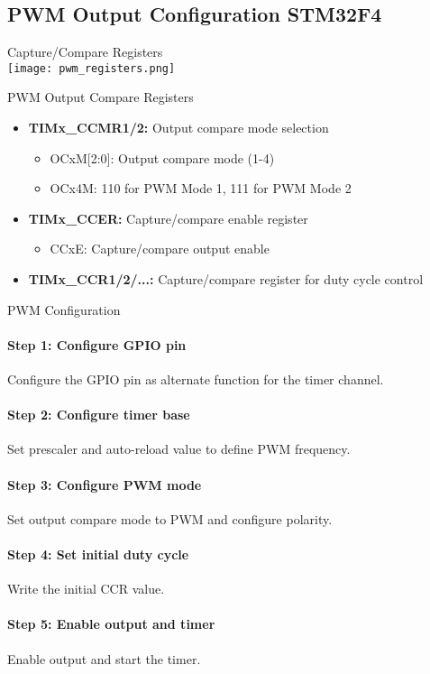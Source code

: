 \raggedcolumns
\columnbreak




\subsection{PWM Output Configuration STM32F4}

\begin{definition}{Capture/Compare Registers}\\
    \texttt{[image: pwm\_registers.png]}
\end{definition}

\begin{corollary}{PWM Output Compare Registers}
\begin{itemize}
    \item \textbf{TIMx\_CCMR1/2:} Output compare mode selection
    \begin{itemize}
        \item OCxM[2:0]: Output compare mode (1-4)
        \item OCx4M: 110 for PWM Mode 1, 111 for PWM Mode 2
    \end{itemize}
    \item \textbf{TIMx\_CCER:} Capture/compare enable register
    \begin{itemize}
        \item CCxE: Capture/compare output enable
    \end{itemize}
    \item \textbf{TIMx\_CCR1/2/...:} Capture/compare register for duty cycle control
    \end{itemize}
\end{corollary}

\begin{KR}{PWM Configuration}
\paragraph{Step 1: Configure GPIO pin}
Configure the GPIO pin as alternate function for the timer channel.
\paragraph{Step 2: Configure timer base}
Set prescaler and auto-reload value to define PWM frequency.
\paragraph{Step 3: Configure PWM mode}
Set output compare mode to PWM and configure polarity.
\paragraph{Step 4: Set initial duty cycle}
Write the initial CCR value.
\paragraph{Step 5: Enable output and timer}
Enable output and start the timer.
\end{KR}

